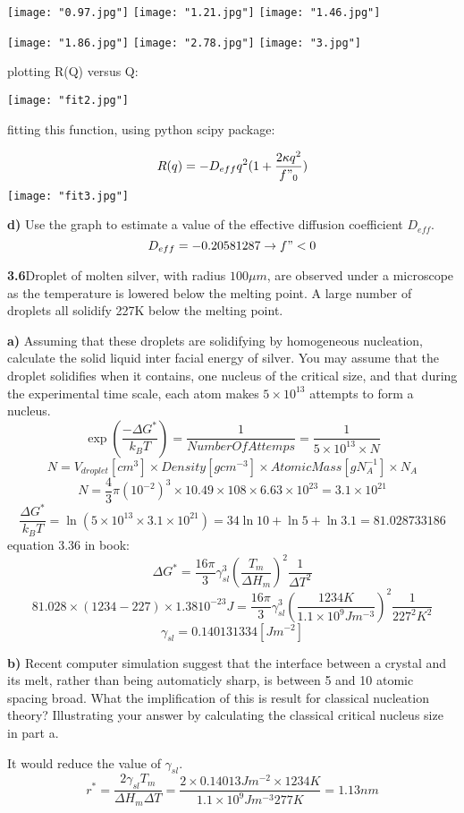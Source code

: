 \documentclass[a4paper,12pt]{report}
\begin{document}
\texttt{[image: "0.97.jpg"]}
\texttt{[image: "1.21.jpg"]}
\texttt{[image: "1.46.jpg"]}

\texttt{[image: "1.86.jpg"]}
\texttt{[image: "2.78.jpg"]}
\texttt{[image: "3.jpg"]}

plotting R(Q) versus Q:

\texttt{[image: "fit2.jpg"]}

fitting this function, using python scipy package:

\[
R(q) = -D_{eff} q^2 (1+\frac{2\kappa q^2}{f"_0})
\]
\texttt{[image: "fit3.jpg"]}

\textbf{d)} Use the graph to estimate a value of the effective diffusion coefficient $D_{eff}$.
\[
D_{eff} =-0.20581287 \to f"<0
\]

\textbf{3.6}Droplet of molten silver, with radius $100\mu m$,
 are observed under a microscope as the temperature is lowered below the melting point.
  A large number of droplets all solidify 227K below the melting point.

\textbf{a)} Assuming that these droplets are solidifying by homogeneous nucleation,
 calculate the solid liquid inter facial energy of silver.
  You may assume that the droplet solidifies when it contains,
  one nucleus of the critical size,
  and that during the experimental time scale, 
  each atom makes $5\times10^{13}$ attempts to form a nucleus.
\[
\exp(\frac{-\Delta G^*}{k_BT}) = \frac{1}{Number Of Attemps} =
 \frac{1}{5\times 10^{13}\times N}
\]
\[
N = V_{droplet} [cm^3] \times Density[gcm^{-3}] \times AtomicMass[g N_{A}^{-1}] \times N_{A}
\]
\[
N = \frac{4}{3} \pi (10^{-2})^3 \times 10.49 \times 108 \times 6.63 \times10^{23} = 3
.1 \times 10^{21}
\]
\[
\frac{\Delta G^*}{k_BT} = \ln(5\times 10^{13}\times3.1 \times 10^{21})=
 34\ln{10} + \ln{5} + \ln{3.1} = 81.028733186
\]
equation 3.36 in book:
\[
\Delta G^* = \frac{16\pi}{3} \gamma_{sl}^{3} (\frac{T_m}{\Delta H_m})^2 \frac{1}{\Delta T^2}
\]
\[
81.028 \times (1234 - 227) \times 1.38 10^{-23} J =
 \frac{16\pi}{3} \gamma_{sl}^{3} (\frac{1234K}{ 1.1\times 10^9 Jm^{-3}})^2 \frac{1}{ 227^2 K^2}
\]
\[
\gamma_{sl} = 0.140131334[Jm^{-2}]
\]

\textbf{b)} Recent computer simulation suggest that the interface between a crystal and its melt,
 rather than being automaticly sharp,
  is between 5 and 10 atomic spacing broad.
  What the implification of this is result for classical nucleation theory?
  Illustrating your answer by calculating the classical critical nucleus size in part a.

It would reduce the value of $\gamma_{sl}$.
\[
r^* = \frac{2\gamma_{sl} T_m}{\Delta H_m \Delta T} = 
\frac{2\times 0.14013 Jm^{-2} \times 1234 K}{1.1\times 10^9 Jm^{-3} 277K} = 
1.13 nm 
\]
\end{document}
